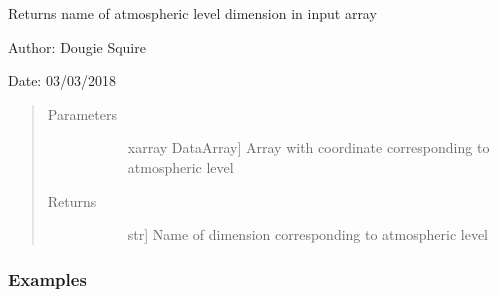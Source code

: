 \documentclass[letterpaper,10pt,english]{sphinxmanual}
\begin{document}
\begin{fulllineitems}
\label{\detokenize{utils_doc:utils.get_level_name}}
Returns name of atmospheric level dimension in input array

\begin{DUlineblock}{0em}
\item[] Author: Dougie Squire
\item[] Date: 03/03/2018
\end{DUlineblock}
\begin{quote}\begin{description}
\item[{Parameters}] \leavevmode\begin{description}
\item[{}] \leavevmode{[}xarray DataArray{]}
Array with coordinate corresponding to atmospheric level

\end{description}

\item[{Returns}] \leavevmode\begin{description}
\item[{}] \leavevmode{[}str{]}
Name of dimension corresponding to atmospheric level

\end{description}

\end{description}\end{quote}
\subsubsection*{Examples}


\end{fulllineitems}
\end{document}
